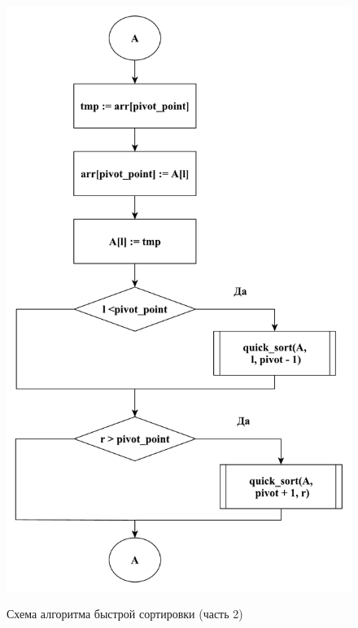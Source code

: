 \documentclass[a4paper,12pt]{article}
\begin{document}
        \begin{figure}[h!]
        	\begin{center}
        		{\includegraphics[scale = 0.55]{schema03.pdf}}
        		\caption{Схема алгоритма быстрой сортировки (часть 2)}
        		\label{fig:schema_quick_sort_2}
        	\end{center}
        \end{figure}
    
    
	    
\end{document}
